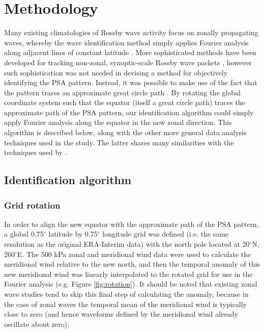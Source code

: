 \section{Methodology}

Many existing climatologies of Rossby wave activity focus on zonally propagating waves, whereby the wave identification method simply applies Fourier analysis along adjacent lines of constant latitude \citep[e.g.][]{Glatt2014,IrvingSimmonds2015}. More sophisticated methods have been developed for tracking non-zonal, synoptic-scale Rossby wave packets \citep[e.g.][]{Zimin2006,Souders2014}, however such sophistication was not needed in devising a method for objectively identifying the PSA pattern. Instead, it was possible to make use of the fact that the pattern traces an approximate great circle path \citep{Hoskins1981}. By rotating the global coordinate system such that the equator (itself a great circle path) traces the approximate path of the PSA pattern, our identification algorithm could simply apply Fourier analysis along the equator in the new zonal direction. This algorithm is described below, along with the other more general data analysis techniques used in the study. The latter shares many similarities with the techniques used by \citet{IrvingSimmonds2015}.

\subsection{Identification algorithm}

\subsubsection{Grid rotation}

In order to align the new equator with the approximate path of the PSA pattern, a global 0.75$^{\circ}$ latitude by 0.75$^{\circ}$ longitude grid was defined (i.e. the same resolution as the original ERA-Interim data) with the north pole located at 20$^{\circ}$N, 260$^{\circ}$E. The 500 hPa zonal and meridional wind data were used to calculate the meridional wind relative to the new north, and then the temporal anomaly of this new meridional wind was linearly interpolated to the rotated grid for use in the Fourier analysis (e.g. Figure \ref{fig:rotation}). It should be noted that existing zonal wave studies \citep[e.g.][]{IrvingSimmonds2015} tend to skip this final step of calculating the anomaly, because in the case of zonal waves the temporal mean of the meridional wind is typically close to zero (and hence waveforms defined by the meridional wind already oscillate about zero). 


